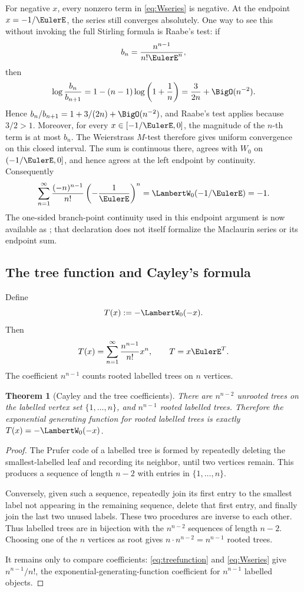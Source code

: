 \documentclass[11pt]{article}
\newtheorem{theorem}{Theorem}[section]
\theoremstyle{remark}
\newcommand{\Wz}{\LambertW_{0}}
\begin{document}
For negative \(x\), every nonzero term in \eqref{eq:Wseries} is negative.
At the endpoint \(x=-1/\EulerE\), the series still converges absolutely.  One
way to see this without invoking the full Stirling formula is Raabe's test:
if
\[
 b_n=\frac{n^{n-1}}{n!\EulerE^n},
\]
then
\[
 \log\frac{b_n}{b_{n+1}}
 =1-(n-1)\log\left(1+\frac1n\right)
 =\frac{3}{2n}+\BigO(n^{-2}).
\]
Hence \(b_n/b_{n+1}=1+3/(2n)+\BigO(n^{-2})\), and Raabe's test applies
because \(3/2>1\).  Moreover, for every \(x\in[-1/\EulerE,0]\), the magnitude
of the \(n\)-th term is at most \(b_n\).  The Weierstrass \(M\)-test
therefore gives uniform convergence on this closed interval.  The sum is
continuous there, agrees with \(W_0\) on \((-1/\EulerE,0]\), and hence agrees at
the left endpoint by continuity.  Consequently
\[
 \sum_{n=1}^{\infty}
 \frac{(-n)^{n-1}}{n!}\left(-\frac1\EulerE\right)^n
 =\Wz(-1/\EulerE)=-1.
\]
The one-sided branch-point continuity used in this endpoint argument is now
available as ; that
declaration does not itself formalize the Maclaurin series or its endpoint
sum.

\subsection{The tree function and Cayley's formula}

Define
\begin{equation}\label{eq:treefunction}
       T(x):=-\Wz(-x).
\end{equation}
Then
\[
 T(x)=\sum_{n=1}^{\infty}\frac{n^{n-1}}{n!}x^n,
 \qquad T=x\EulerE^T.
\]
The coefficient \(n^{n-1}\) counts rooted labelled trees on \(n\) vertices.

\begin{theorem}[Cayley and the tree coefficients]\label{thm:cayley}
There are \(n^{n-2}\) unrooted trees on the labelled vertex set
\(\{1,\ldots,n\}\), and \(n^{n-1}\) rooted labelled trees.  Therefore the
exponential generating function for rooted labelled trees is exactly
\(T(x)=-\Wz(-x)\).
\end{theorem}

\begin{proof}
The Prufer code of a labelled tree is formed by repeatedly deleting the
smallest-labelled leaf and recording its neighbor, until two vertices
remain.  This produces a sequence of length \(n-2\) with entries in
\(\{1,\ldots,n\}\).

Conversely, given such a sequence, repeatedly join its first entry to the
smallest label not appearing in the remaining sequence, delete that first
entry, and finally join the last two unused labels.  These two procedures
are inverse to each other.  Thus labelled trees are in bijection with the
\(n^{n-2}\) sequences of length \(n-2\).  Choosing one of the \(n\) vertices
as root gives \(n\cdot n^{n-2}=n^{n-1}\) rooted trees.

It remains only to compare coefficients: \eqref{eq:treefunction} and
\eqref{eq:Wseries} give \(n^{n-1}/n!\), the exponential-generating-function
coefficient for \(n^{n-1}\) labelled objects.
\end{proof}
\end{document}
